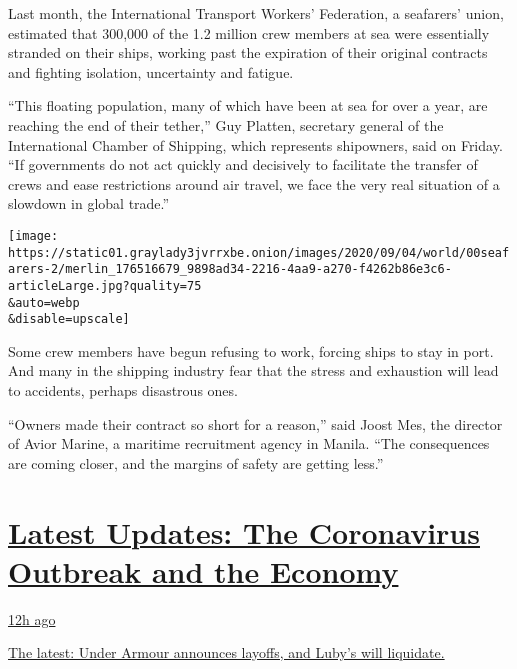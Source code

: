 Last month, the International Transport Workers' Federation, a
seafarers' union, estimated that 300,000 of the 1.2 million crew members
at sea were essentially stranded on their ships, working past the
expiration of their original contracts and fighting isolation,
uncertainty and fatigue.

``This floating population, many of which have been at sea for over a
year, are reaching the end of their tether,'' Guy Platten, secretary
general of the International Chamber of Shipping, which represents
shipowners, said on Friday. ``If governments do not act quickly and
decisively to facilitate the transfer of crews and ease restrictions
around air travel, we face the very real situation of a slowdown in
global trade.''

\texttt{[image: https://static01.graylady3jvrrxbe.onion/images/2020/09/04/world/00seafarers-2/merlin\_176516679\_9898ad34-2216-4aa9-a270-f4262b86e3c6-articleLarge.jpg?quality=75\\\&auto=webp\\\&disable=upscale]}

Some crew members have begun refusing to work, forcing ships to stay in
port. And many in the shipping industry fear that the stress and
exhaustion will lead to accidents, perhaps disastrous ones.

``Owners made their contract so short for a reason,'' said Joost Mes,
the director of Avior Marine, a maritime recruitment agency in Manila.
``The consequences are coming closer, and the margins of safety are
getting less.''

\hypertarget{latest-updates-the-coronavirus-outbreak-and-the-economy}{%
\section{\texorpdfstring{\href{https://www.nytimes3xbfgragh.onion/live/2020/09/08/business/stock-market-today-coronavirus?action=click\&pgtype=Article\&state=default\&region=MAIN_CONTENT_1\&context=storylines_live_updates}{Latest
Updates: The Coronavirus Outbreak and the
Economy}}{Latest Updates: The Coronavirus Outbreak and the Economy}}\label{latest-updates-the-coronavirus-outbreak-and-the-economy}}

\href{https://www.nytimes3xbfgragh.onion/live/2020/09/08/business/stock-market-today-coronavirus?action=click\&pgtype=Article\&state=default\&region=MAIN_CONTENT_1\&context=storylines_live_updates\#the-latest-under-armour-announces-layoffs-and-lubys-will-liquidate}{12h
ago}

\href{https://www.nytimes3xbfgragh.onion/live/2020/09/08/business/stock-market-today-coronavirus?action=click\&pgtype=Article\&state=default\&region=MAIN_CONTENT_1\&context=storylines_live_updates\#the-latest-under-armour-announces-layoffs-and-lubys-will-liquidate}{The
latest: Under Armour announces layoffs, and Luby's will liquidate.}

